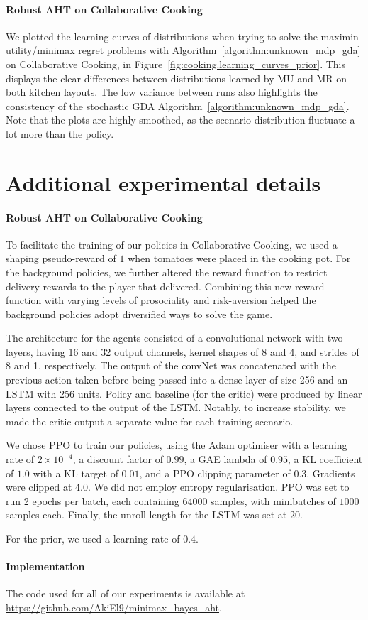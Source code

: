 \paragraph{Robust AHT on Collaborative Cooking}

We plotted the learning curves of distributions when trying to solve the maximin utility/minimax regret problems with Algorithm~\ref{algorithm:unknown_mdp_gda} on Collaborative Cooking, in Figure~\ref{fig:cooking.learning_curves_prior}. This displays the clear differences between distributions learned by MU and MR on both kitchen layouts. The low variance between runs also highlights the consistency of the stochastic GDA Algorithm~\ref{algorithm:unknown_mdp_gda}. Note that the plots are highly smoothed, as the scenario distribution fluctuate a lot more than the policy.

    

\section{Additional experimental details}

\paragraph{Robust AHT on Collaborative Cooking}
To facilitate the training of our policies in Collaborative Cooking, we used a shaping pseudo-reward of $1$ when tomatoes were placed in the cooking pot. For the background policies, we further altered the reward function to restrict delivery rewards to the player that delivered. Combining this new reward function with varying levels of prosociality and risk-aversion helped the background policies adopt diversified ways to solve the game.

The architecture for the agents consisted of a convolutional network with two layers, having 16 and 32 output channels, kernel shapes of 8 and 4, and strides of 8 and 1, respectively. The output of the convNet was concatenated with the previous action taken before being passed into a dense layer of size 256 and an LSTM with 256 units. Policy and baseline (for the critic) were produced by linear layers connected to the output of the LSTM. Notably, to increase stability, we made the critic output a separate value for each training scenario.

We chose PPO to train our policies, using the Adam optimiser with a learning rate of $2 \times 10^{-4}$, a discount factor of $0.99$, a GAE lambda of $0.95$, a KL coefficient of $1.0$ with a KL target of $0.01$, and a PPO clipping parameter of $0.3$. Gradients were clipped at 4.0. We did not employ entropy regularisation. PPO was set to run 2 epochs per batch, each containing $64000$ samples, with minibatches of $1000$ samples each. Finally, the unroll length for the LSTM was set at $20$.

For the prior, we used a learning rate of $0.4$. 

\paragraph{Implementation}
The code used for all of our experiments is available at \hyperlink{https://github.com/AkiEl9/minimax_bayes_aht}{\url{https://github.com/AkiEl9/minimax_bayes_aht}}.